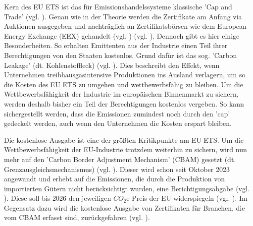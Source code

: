 Kern des EU ETS ist das für Emissionshandelssysteme klassische 'Cap and Trade' (vgl. \cite{eu.2023}). Genau wie in der Theorie werden die Zertifikate am Anfang via Auktionen ausgegeben und nachträglich an Zertifikatsbörsen wie dem European Energy Exchange (EEX) gehandelt (vgl. \cite[S. 186]{hubert.2020}) (vgl. \cite{eu.2024}).
Dennoch gibt es hier einige Besonderheiten. So erhalten Emittenten aus der Industrie einen Teil ihrer Berechtigungen von den Staaten kostenlos.
Grund dafür ist das sog. 'Carbon Leakage' (dt. Kohlenstoffleck) (vgl. \cite{eu2.2023}).
Dies beschreibt den Effekt, wenn Unternehmen treibhausgasintensive Produktionen ins Ausland verlagern, um so die Kosten des EU ETS zu umgehen und wettbewerbsfähig zu bleiben.
Um die Wettbewerbsfähigkeit der Industrie im europäischen Binnenmarkt zu sichern, werden deshalb bisher ein Teil der Berechtigungen kostenlos vergeben.
So kann sichergestellt werden, dass die Emissionen zumindest noch durch den 'cap' gedeckelt werden, auch wenn den Unternehmen die Kosten erspart bleiben.

Die kostenlose Ausgabe ist eine der größten Kritikpunkte am EU ETS. Um die Wettbewerbsfähigkeit der EU-Industrie trotzdem weiterhin zu sichern, wird nun mehr auf den 'Carbon Border Adjustment Mechanism' (CBAM) gesetzt (dt. Grenzausgleichsmechanismus) (vgl. \cite{ub.2023}).
Dieser wird schon seit Oktober 2023 angewandt und erhebt auf die Emissionen, die durch die Produktion von importierten Gütern nicht berücksichtigt wurden, eine Berichtigungsabgabe (vgl. \cite{ub2.2023}).
Diese soll bis 2026 den jeweiligen $CO_2$e-Preis der EU widerspiegeln (vgl. \cite{ub.2023}).
Im Gegensatz dazu wird die kostenlose Ausgabe von Zertifikaten für Branchen, die vom CBAM erfasst sind, zurückgefahren (vgl. \cite{ub.2023}).


